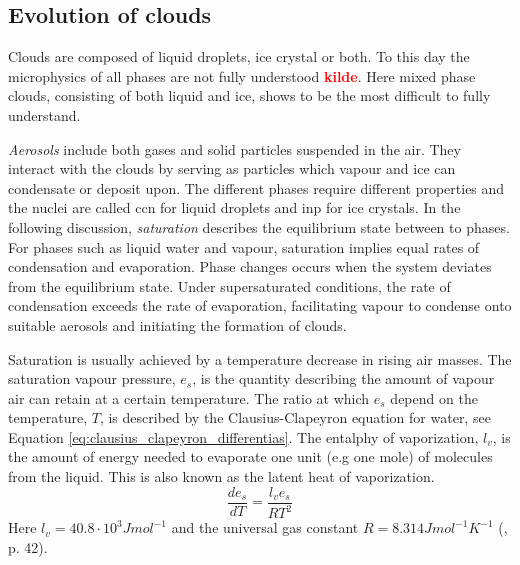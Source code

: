 \subsection{Evolution of clouds}
Clouds are composed of liquid droplets, ice crystal or both. To this day the microphysics of all phases are not fully understood \textcolor{red}{\textbf{kilde}}. Here mixed phase clouds, consisting of both liquid and ice, shows to be the most difficult to fully understand. 

\textit{Aerosols} include both gases and solid particles suspended in the air. They interact with the clouds by serving as particles which vapour and ice can condensate or deposit upon. The different phases require different properties and the nuclei are called \acrfull{ccn} for liquid droplets and \acrfull{inp} for ice crystals. 
In the following discussion, \textit{saturation} describes the equilibrium state between to phases. %
For phases such as liquid water and vapour, saturation implies equal rates of condensation and evaporation. Phase changes occurs when the system deviates from the equilibrium state. Under supersaturated conditions, the rate of condensation exceeds the rate of evaporation, facilitating vapour to condense onto suitable aerosols and initiating the formation of clouds. 

Saturation is usually achieved by a temperature decrease in rising air masses. The saturation vapour pressure, $e_s$, is the quantity describing the amount of vapour air can retain at a certain temperature. The ratio at which $e_s$ depend on the temperature, $T$, is described by the Clausius-Clapeyron equation for water, see Equation \eqref{eq:clausius_clapeyron_differentias}. The entalphy of vaporization, $l_v$, is the amount of energy needed to evaporate one unit (e.g one mole) of molecules from the liquid. This is also known as the latent heat of vaporization. 
\begin{equation} \label{eq:clausius_clapeyron_differentias}
    \frac{de_s}{dT} = \frac{l_v e_s}{R T^2}
\end{equation}
Here $l_v = 40.8 \cdot 10^3 J mol^{-1}$ and the universal gas constant $R= 8.314 J mol^{-1} K^{-1}$ (\cite{cloud_phys_book_johanne}, p. 42). 

